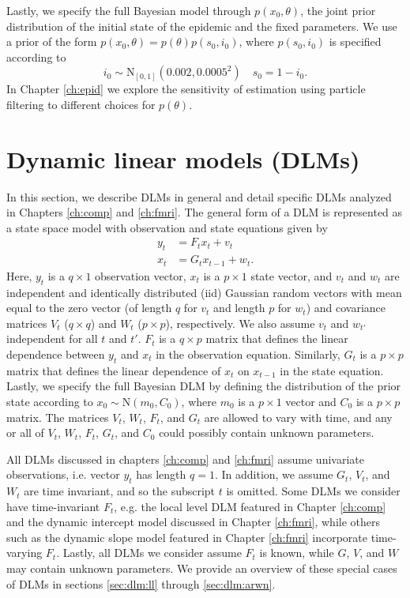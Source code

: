 Lastly, we specify the full Bayesian model through $p(x_0, \theta)$, the joint prior distribution of the initial state of the epidemic and the fixed parameters. We use a prior of the form $p(x_0,\theta) = p(\theta)p(s_0,i_0)$, where $p(s_0,i_0)$ is specified according to
\begin{equation}
i_0 \sim \mbox{N}_{[0,1]}(0.002,0.0005^2) \quad s_0 = 1 - i_0. \label{eqn:epid:prior:state}
\end{equation}
In Chapter \ref{ch:epid} we explore the sensitivity of estimation using particle filtering to different choices for $p(\theta)$.

\section{Dynamic linear models (DLMs) \label{sec:dlm}}

In this section, we describe DLMs in general and detail specific DLMs analyzed in Chapters \ref{ch:comp} and \ref{ch:fmri}. The general form of a DLM is represented as a state space model with observation and state equations given by
\begin{align}
y_t &= F_tx_t + v_t \label{eqn:dlm:obs} \\
x_t &= G_tx_{t-1} + w_t. \label{eqn:dlm:state}
\end{align}
Here, $y_t$ is a $q \times 1$ observation vector, $x_t$ is a $p \times 1$ state vector, and $v_t$ and $w_t$ are independent and identically distributed (iid) Gaussian random vectors with mean equal to the zero vector (of length $q$ for $v_t$ and length $p$ for $w_t$) and covariance matrices $V_t$ ($q \times q$) and $W_t$ ($p \times p$), respectively. We also assume $v_t$ and $w_{t'}$ independent for all $t$ and $t'$. $F_t$ is a $q \times p$ matrix that defines the linear dependence between $y_t$ and $x_t$ in the observation equation. Similarly, $G_t$ is a $p \times p$ matrix that defines the linear dependence of $x_t$ on $x_{t-1}$ in the state equation. Lastly, we specify the full Bayesian DLM by defining the distribution of the prior state according to $x_0 \sim \mbox{N}(m_0, C_0)$, where $m_0$ is a $p \times 1$ vector and $C_0$ is a $p \times p$ matrix. The matrices $V_t$, $W_t$, $F_t$, and $G_t$ are allowed to vary with time, and any or all of $V_t$, $W_t$, $F_t$, $G_t$, and $C_0$ could possibly contain unknown parameters.

All DLMs discussed in chapters \ref{ch:comp} and \ref{ch:fmri} assume univariate observations, i.e. vector $y_t$ has length $q = 1$. In addition, we assume $G_t$, $V_t$, and $W_t$ are time invariant, and so the subscript $t$ is omitted. Some DLMs we consider have time-invariant $F_t$, e.g. the local level DLM featured in Chapter \ref{ch:comp} and the dynamic intercept model discussed in Chapter \ref{ch:fmri}, while others such as the dynamic slope model featured in Chapter \ref{ch:fmri} incorporate time-varying $F_t$. Lastly, all DLMs we consider assume $F_t$ is known, while $G$, $V$, and $W$ may contain unknown parameters. We provide an overview of these special cases of DLMs in sections \ref{sec:dlm:ll} through \ref{sec:dlm:arwn}.

